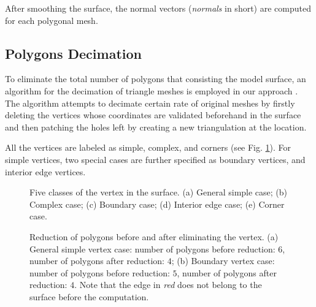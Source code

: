 After smoothing the surface, the normal vectors (\emph{normals} in short) are computed for each polygonal mesh.

\subsection{Polygons Decimation}
\label{subsec:decimation}

To eliminate the total number of polygons that consisting the model surface, an algorithm for the decimation of triangle meshes is employed in our approach \cite{Schroeder1992}.
The algorithm attempts to decimate certain rate of original meshes by firstly deleting the vertices whose coordinates are validated beforehand in the surface and then patching the holes left by creating a new triangulation at the location. %

All the vertices are labeled as simple, complex, and corners (see Fig. \ref{fig:FiveClasses}).
For simple vertices, two special cases are further specified as boundary vertices, and interior edge vertices.
\begin{figure}[t]
\centering
\subfloat{

\label{fig:GeneralSimple}
}
\hfil
\subfloat{

\label{fig:Complex}
}
\hfil
\subfloat{

\label{fig:Boundary}
}
\hfil
\subfloat{

\label{fig:InteriorEdge}
}
\hfil
\subfloat{

\label{fig:Corner}
}
\caption{Five classes of the vertex in the surface. (a) General simple case; (b) Complex case; (c) Boundary case; (d) Interior edge case; (e) Corner case. }%
\label{fig:FiveClasses}
\end{figure}
\begin{figure}[t]
\centering
\subfloat{

\label{fig:SimpleReduction}
}
\hfil
\subfloat{

\label{fig:BoundaryReduction}
}
\caption{Reduction of polygons before and after eliminating the vertex. (a) General simple vertex case: number of polygons before reduction: $6$, number of polygons after reduction: $4$; (b) Boundary vertex case: number of polygons before reduction: $5$, number of polygons after reduction: $4$. Note that the edge in \emph{red} does not belong to the surface before the computation. }%
\label{fig:Reduction}
\end{figure}

